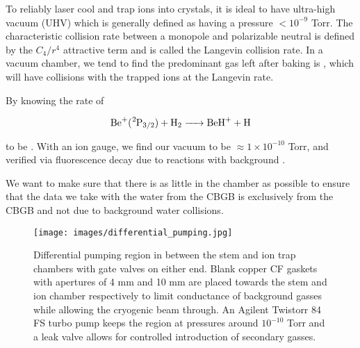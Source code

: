 To reliably laser cool and trap ions into crystals, it is ideal to have ultra-high vacuum (UHV) which is generally defined as having a pressure $<10^{-9}$ Torr. The characteristic collision rate between a monopole and polarizable neutral is defined by the $C_4/r^4$ attractive term and is called the Langevin collision rate. In a vacuum chamber, we tend to find the predominant gas left after baking is , which will have collisions with the trapped ions at the Langevin rate.

By knowing the rate of

\begin{equation}
	\ce{Be+(^2P3/2) + H2 -> BeH+ + H}
	\label{eq: Be+H2->BeH}
\end{equation}

to be \cite{Roth2006}. With an ion gauge, we find our vacuum to be $\approx 1 \times 10^{-10}$ Torr, and verified via  fluorescence decay due to reactions with background .

We want to make sure that there is as little  in the chamber as possible to ensure that the data we take with the water from the CBGB is exclusively from the CBGB and not due to background water collisions.

\begin{figure}[H]
	\centering
	\texttt{[image: images/differential\_pumping.jpg]}
	\caption{Differential pumping region in between the stem and ion trap chambers with gate valves on either end. Blank copper CF gaskets with apertures of 4 mm and 10 mm are placed towards the stem and ion chamber respectively to limit conductance of background gasses while allowing the cryogenic beam through. An Agilent Twistorr 84 FS turbo pump keeps the region at pressures around $10^{-10}$ Torr and a leak valve allows for controlled introduction of secondary gasses.}
\end{figure}